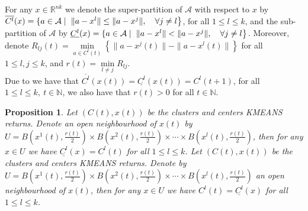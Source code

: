 \documentclass[11pt]{article}
\numberwithin{equation}{section}
\newtheorem{proposition}{Proposition}[section]
\begin{document}
For any $x \in \mathbb{R}^{nk}$ we denote the super-partition of $\mathcal{A}$ with respect to $x$ by $\overline{C^l}(x) = \left\lbrace a \in \mathcal{A} \mid \right. \\ \left. \|a - x^l\| \leq \|a - x^j\| , \quad \forall j \neq l \right\rbrace$, for all $1 \leq l \leq k$, and the sub-partition of $\mathcal{A}$ by $\underline{C^l}(x) = \left\lbrace a \in \mathcal{A} \mid \right. \\ \left. \|a - x^l\| < \|a - x^j\|, \quad \forall j \neq l \right\rbrace$.
Moreover, denote $R_{lj}(t) = \min\limits_{a \in C^l(t)} \left\lbrace \|a - x^j(t)\| - \|a - x^l(t)\| \right\rbrace$ for all $1 \leq l,j \leq k$, and $r(t) = \min\limits_{l \neq j} R_{lj}$. \\
Due to  we have that $\overline{C^l}(x(t)) = \underline{C^l}(x(t)) = C^l(t+1)$, for all $1 \leq l \leq k, \: t \in \mathbb{N}$, we also have that $r(t) > 0$ for all $t \in \mathbb{N}$.

\begin{proposition} \label{StateEq24}
Let $(C(t), x(t))$ be the clusters and centers KMEANS returns. Denote an open neighbourhood of $x(t)$ by $U = B\left( x^1(t),\frac{r(t)}{2}\right) \times  B\left( x^2(t),\frac{r(t)}{2}\right) \times \cdots \times B\left( x^l(t),\frac{r(t)}{2} \right)$, then for any $x \in U$ we have $\underline{C^l}(x)= C^l(t)$ for all $1 \leq l \leq k$.
Let $(C(t), x(t))$ be the clusters and centers KMEANS returns. Denote by $U = B\left( x^1(t),\frac{r(t)}{2}\right) \times  B\left( x^2(t),\frac{r(t)}{2}\right) \times \cdots \times B\left( x^l(t),\frac{r(t)}{2} \right)$ an open neighbourhood of $x(t)$, then for any $x \in U$ we have $C^l(t) = \underline{C^l}(x)$ for all $1 \leq l \leq k$.
\end{proposition}
\end{document}
